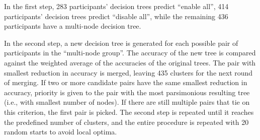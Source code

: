 In the first step, 283 participants' decision trees predict ``enable all'', 414 participants' decision trees predict ``disable all'', while the remaining 436 participants have a multi-node decision tree.

In the second step, a new decision tree is generated for each possible pair of participants in the ``multi-node group''. The accuracy of the new tree is compared against the weighted average of the accuracies of the original trees. The pair with smallest reduction in accuracy is merged, leaving 435 clusters for the next round of merging. If two or more candidate pairs have the same smallest reduction in accuracy, priority is given to the pair with the most parsimonious resulting tree (i.e., with smallest number of nodes). If there are still multiple pairs that tie on this criterion, the first pair is picked. The second step is repeated until it reaches the predefined number of clusters, and the entire procedure is repeated with 20 random starts to avoid local optima.

